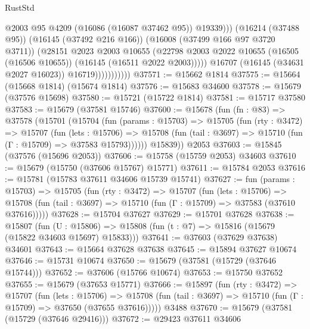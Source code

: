 \begin{lexlean}{RustStd}
\begin{coremodule}
                                  @2003
                                  @95
                                  @4209
                                  (@16086 (@16087 @37462 @95))
                                  @19339)))
                            (@16214 (@37488 @95))
                            (@16145 (@37492 @216 @166))
                            (@16008 (@37499 @166 @97 @3720 @3711))
                            (@28151
                              @2023
                              @2003
                              @10655
                              (@22798
                                @2003
                                @2022
                                @10655
                                (@16505 (@16506 @10655))
                                (@16145 (@16511 @2022 @2003)))))
                          @16707
                          (@16145 (@34631 @2027 @16023))
                          @16719)))))))))))
@37571 := @15662 @1814
@37575 := @15664 (@15668 @1814) (@15674 @1814)
@37576 := @15683 @34600
@37578 := @15679 (@37576 @15698)
@37580 := @15721 (@15722 @1814)
@37581 := @15717 @37580
@37583 := @15679 (@37581 @15746)
@37600 := @15678
    (fun (fn : @83) =>
    @37578
      (@15701
        (@15704
          (fun (params : @15703) =>
          @15705
            (fun (rty : @3472) =>
            @15707
              (fun (lets : @15706) =>
              @15708 (fun (tail : @3697) => @15710 (fun (Γ : @15709) => @37583 @15793))))))
        @15839))
    @2053
@37603 := @15845 (@37576 (@15696 @2053))
@37606 := @15758 (@15759 @2053) @34603
@37610 := @15679 (@15750 (@37606 @15767) @15771)
@37611 := @15784 @2053
@37616 := @15781 (@15783 @37611 @34606 @15739 @15741)
@37627 := fun (params : @15703) =>
  @15705
    (fun (rty : @3472) =>
    @15707
      (fun (lets : @15706) =>
      @15708 (fun (tail : @3697) => @15710 (fun (Γ : @15709) => @37583 (@37610 @37616)))))
@37628 := @15704 @37627
@37629 := @15701 @37628
@37638 := @15807
    (fun (U : @15806) => @15808 (fun (t : @7) => @15816 (@15679 (@15822 @34603 @15697) @15833)))
@37641 := @37603 (@37629 @37638) @34601
@37643 := @15664 @37628 @37638
@37645 := @15894 @37627 @10674
@37646 := @15731 @10674
@37650 := @15679 (@37581 (@15729 (@37646 @15744)))
@37652 := @37606 (@15766 @10674)
@37653 := @15750 @37652
@37655 := @15679 (@37653 @15771)
@37666 := @15897
    (fun (rty : @3472) =>
    @15707
      (fun (lets : @15706) =>
      @15708 (fun (tail : @3697) => @15710 (fun (Γ : @15709) => @37650 (@37655 @37616)))))
    @3488
@37670 := @15679 (@37581 (@15729 (@37646 @29416)))
@37672 := @29423 @37611 @34606

\end{coremodule}
\end{lexlean}
